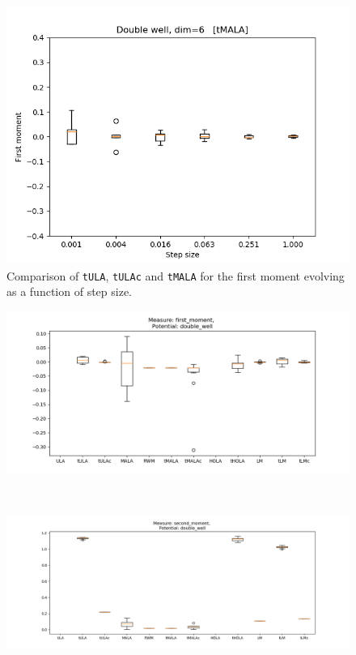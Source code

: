 \begin{figure}
\begin{minipage}[b]{0.32\textwidth}
    \includegraphics[width=\textwidth]{Figures/tmala_fm.png}
  \end{minipage}
   \caption{Comparison of \texttt{tULA}, \texttt{tULAc} and \texttt{tMALA} for the first moment evolving as a function of step size.}
\end{figure}

\begin{figure}
\centering
  \begin{minipage}[b]{0.85\textwidth}
  \centering
    \includegraphics[width=\textwidth]{Figures/doublewell_0_1_10_5samp_100dFirstMoment.png}
  \end{minipage}\\ %
  \begin{minipage}[b]{0.85\textwidth}
  \centering
    \includegraphics[width=\textwidth]{Figures/secondmoment_double_well_100d_10_5samp.png}
  \end{minipage} %
  \caption{}
  \label{fig:doubleWell_moment}
  \end{figure}
